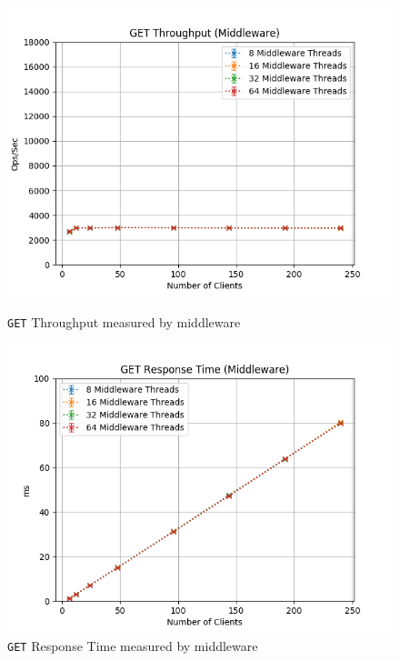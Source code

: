\documentclass[11pt,a4paper]{article}
\begin{document}
%
\begin{figure}[H]
	\centering
    \begin{minipage}{0.5\textwidth}
        \centering
        \includegraphics[width=\textwidth]{../illustrations/plots/2_2_two_middlewares/0-1/middleware_get_tp_s.png}
        \caption{\texttt{GET} Throughput measured by middleware}
        \label{fig:one_middleware_set_tp_mw}
    \end{minipage}\hfill
    \begin{minipage}{0.5\textwidth}
        \centering
        \includegraphics[width=\textwidth]{../illustrations/plots/2_2_two_middlewares/0-1/middleware_get_rt_ms.png}
        \caption{\texttt{GET} Response Time measured by middleware}
        \label{fig:one_middleware_set_rt_mw}
    \end{minipage}
\end{figure}
\end{document}
